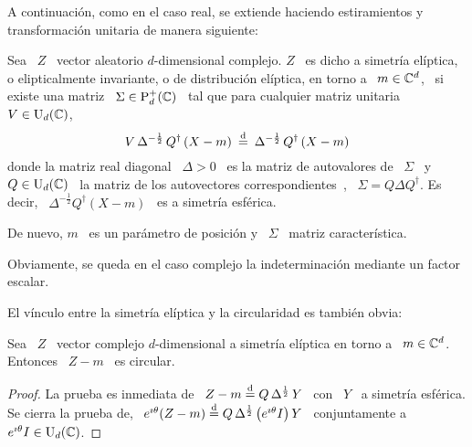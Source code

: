 A continuaci\'on,  como en  el caso real,  se extiende haciendo  estiramientos y
transformaci\'on unitaria de manera siguiente:
%
\begin{definicion}
\label{Def:MP:ElipticoComplejo}
%
  Sea  \ $Z$  \ vector  aleatorio $d$-dimensional  complejo.  $Z$  \ es  dicho a
  simetr\'ia  el\'iptica,  o  elipticalmente  invariante,  o  de  distribuci\'on
  el\'iptica, en torno a \ $m \in \mathbb{C}^d$, \ si existe una matriz \ $\Sigma \in
  \mathrm{P}_d^+(\mathbb{C})$  \  tal   que  para  cualquier  matriz  unitaria   \  $V  \in
  \mathrm{U}_d(\mathbb{C})$,
  \[
  V  \,  \Delta^{-\frac12}  \,  Q^\dag  \left(  X  -  m  \right)  \:  \stackrel{\mathrm{d}}{=}  \:
  \Delta^{-\frac12} \, Q^\dag \left( X - m \right)
  \]
  donde la matriz real diagonal \ $\Delta  > 0$ \ es la matriz de autovalores de
  \  $\Sigma$ \  y \  $Q \in  \mathrm{U}_d(\mathbb{C})$ \  la matriz  de  los autovectores
  correspondientes~\cite{Bha97,   Bha07,  HorJoh13},  \   $\Sigma  =   Q  \Delta
  Q^\dag$. Es  decir, \ $\Delta^{-\frac12} Q^\dag \left(  X - m \right)$  \ es a
  simetr\'ia esf\'erica.

  De  nuevo, $m$  \  es  un par\'ametro  de  posici\'on y  \  $\Sigma$ \  matriz
  caracter\'istica.
\end{definicion}
%
Obviamente, se queda en el caso complejo la indeterminaci\'on mediante un factor
escalar.

El v\'inculo entre la simetr\'ia el\'iptica y la circularidad es tambi\'en obvia:
%
\begin{lema}
  Sea \ $Z$ \ vector complejo $d$-dimensional a simetr\'ia el\'iptica en torno a
  \ $m \in \mathbb{C}^d$. Entonces \ $Z-m$ \ es circular.
\end{lema}
%
\begin{proof}
  La prueba es  inmediata de \ $Z-m \stackrel{\mathrm{d}}{=}  Q \, \Delta^{\frac12} \, Y$  \ con \
  $Y$ \  a simetr\'ia esf\'erica. Se  cierra la prueba de,  \ $e^{\imath \theta}
  (Z-m) \stackrel{\mathrm{d}}{=} Q \, \Delta^{\frac12} \,  \big( e^{\imath \theta} I \big) \, Y$ \
  conjuntamente a \ $e^{\imath \theta} I \in \mathrm{U}_d(\mathbb{C})$.
\end{proof}

